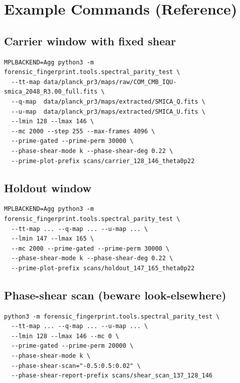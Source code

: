 \documentclass[11pt,a4paper]{article}
\begin{document}
\section{Example Commands (Reference)}

\subsection{Carrier window with fixed shear}
\begin{verbatim}
MPLBACKEND=Agg python3 -m forensic_fingerprint.tools.spectral_parity_test \
  --tt-map data/planck_pr3/maps/raw/COM_CMB_IQU-smica_2048_R3.00_full.fits \
  --q-map  data/planck_pr3/maps/extracted/SMICA_Q.fits \
  --u-map  data/planck_pr3/maps/extracted/SMICA_U.fits \
  --lmin 128 --lmax 146 \
  --mc 2000 --step 255 --max-frames 4096 \
  --prime-gated --prime-perm 30000 \
  --phase-shear-mode k --phase-shear-deg 0.22 \
  --prime-plot-prefix scans/carrier_128_146_theta0p22
\end{verbatim}

\subsection{Holdout window}
\begin{verbatim}
MPLBACKEND=Agg python3 -m forensic_fingerprint.tools.spectral_parity_test \
  --tt-map ... --q-map ... --u-map ... \
  --lmin 147 --lmax 165 \
  --mc 2000 --prime-gated --prime-perm 30000 \
  --phase-shear-mode k --phase-shear-deg 0.22 \
  --prime-plot-prefix scans/holdout_147_165_theta0p22
\end{verbatim}

\subsection{Phase-shear scan (beware look-elsewhere)}
\begin{verbatim}
python3 -m forensic_fingerprint.tools.spectral_parity_test \
  --tt-map ... --q-map ... --u-map ... \
  --lmin 128 --lmax 146 --mc 0 \
  --prime-gated --prime-perm 20000 \
  --phase-shear-mode k \
  --phase-shear-scan="-0.5:0.5:0.02" \
  --phase-shear-report-prefix scans/shear_scan_137_128_146
\end{verbatim}
\end{document}

